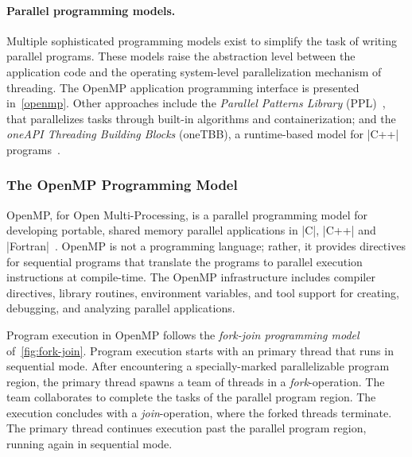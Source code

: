 \paragraph*{Parallel programming models.}
Multiple sophisticated programming models exist to simplify the task of writing parallel programs.
These models raise the abstraction level between the application code and the operating system-level parallelization mechanism of threading.
The OpenMP
application programming interface is presented in~\autoref{openmp}.
Other approaches include the
\emph{Parallel Patterns Library} (PPL)~\cite{ppl2021,campbell2011},
that parallelizes tasks through built-in algorithms and containerization;
and the \emph{oneAPI Threading Building Blocks} (oneTBB),
a runtime-based model for \pr|C++| programs~\cite{onetbb}.

\subsubsection{The OpenMP Programming Model}
\label{openmp}

{OpenMP}, for Open Multi-Processing,
is a parallel programming model for developing portable, shared memory parallel applications in
\pr|C|,
\pr|C++| and
\pr|Fortran|~\cite{openmp_api}.
OpenMP is not a programming language;
rather, it provides directives for sequential programs that translate the programs to parallel execution instructions at compile-time.
The OpenMP infrastructure includes compiler directives, library routines, environment variables, and tool support for creating, debugging, and analyzing parallel applications.

Program execution in OpenMP follows the \emph{fork-join programming model}~\cite[p. 24]{chapman2007} of~\autoref{fig:fork-join}.
Program execution starts with an {primary thread}
that runs in sequential mode.
After encountering a specially-marked parallelizable program region, the primary thread spawns a team of threads in a \emph{fork}-operation.
The team collaborates to complete the tasks of the parallel program region.
The execution concludes with a \emph{join}-operation, where the forked threads terminate.
The primary thread continues execution past the parallel program region, running again in sequential mode.

